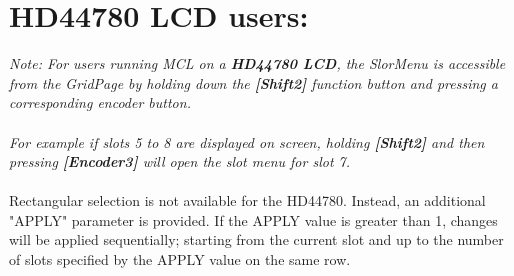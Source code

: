 \section{HD44780 LCD users:}
\textit{Note: For users running MCL on a \textbf{HD44780 LCD}, the SlorMenu  is accessible from the GridPage by holding down the  \textbf{[Shift2]} function button and pressing a corresponding encoder button.\\
\\For example if slots 5 to 8 are displayed on screen, holding  \textbf{[Shift2]} and then pressing \textbf{[Encoder3]} will open the slot menu for slot 7.}\\
\\
Rectangular selection is not available for the HD44780. Instead, an additional "APPLY" parameter is provided. If the APPLY value is greater than 1, changes will be applied sequentially; starting from the current slot and up to the number of slots specified by the APPLY value on the same row.

